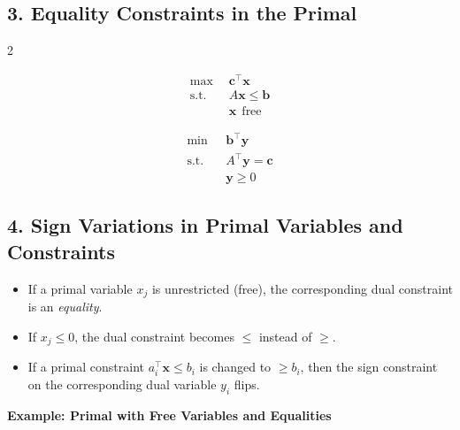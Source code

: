 \subsection*{3. Equality Constraints in the Primal}

\begin{multicols}{2}
\begin{tcolorbox}[title=Primal (P), colback=blue!5, colframe=blue!40!black]
\[
\begin{aligned}
\max\ & \mathbf{c}^\top \mathbf{x} \\
\text{s.t.} \quad & A \mathbf{x} \leq \mathbf{b} \\
& \mathbf{x} \ \ \text{free}
\end{aligned}
\]
\end{tcolorbox}

\columnbreak

\begin{tcolorbox}[title=Dual (D), colback=green!5, colframe=green!40!black]
\[
\begin{aligned}
\min\ & \mathbf{b}^\top \mathbf{y} \\
\text{s.t.} \quad & A^\top \mathbf{y} = \mathbf{c} \\
& \mathbf{y} \geq 0
\end{aligned}
\]
\end{tcolorbox}
\end{multicols}

\subsection*{4. Sign Variations in Primal Variables and Constraints}

\begin{itemize}
  \item If a primal variable \( x_j \) is unrestricted (free), the corresponding dual constraint is an \emph{equality}.
  \item If \( x_j \leq 0 \), the dual constraint becomes \( \leq \) instead of \( \geq \).
  \item If a primal constraint \( a_i^\top \mathbf{x} \leq b_i \) is changed to \( \geq b_i \), then the sign constraint on the corresponding dual variable \( y_i \) flips.
\end{itemize}

\textbf{Example: Primal with Free Variables and Equalities}


